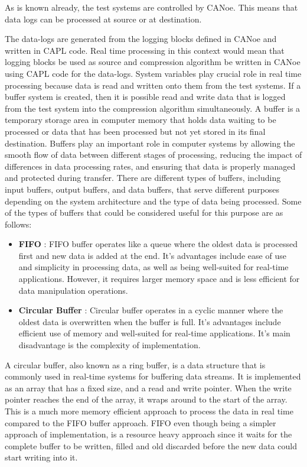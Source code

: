 As is known already, the test systems are controlled by CANoe. This means that data logs can be processed at source or at destination. 

The data-logs are generated from the logging blocks defined in CANoe and written in CAPL code. Real time processing in this context would mean that logging blocks be used as source and compression algorithm be written in CANoe using CAPL code for the data-logs. System variables play crucial role in real time processing because data is read and written onto them from the test systems. If a buffer system is created, then it is possible read and write data that is logged from the test system into the compression algorithm simultaneously. A buffer is a temporary storage area in computer memory that holds data waiting to be processed or data that has been processed but not yet stored in its final destination. Buffers play an important role in computer systems by allowing the smooth flow of data between different stages of processing, reducing the impact of differences in data processing rates, and ensuring that data is properly managed and protected during transfer. There are different types of buffers, including input buffers, output buffers, and data buffers, that serve different purposes depending on the system architecture and the type of data being processed. Some of the types of buffers that could be considered useful for this purpose are as follows:

\begin{itemize}
    \item \textbf{FIFO} : FIFO buffer operates like a queue where the oldest data is processed first and new data is added at the end. It's advantages include ease of use and simplicity in processing data, as well as being well-suited for real-time applications. However, it requires larger memory space and is less efficient for data manipulation operations.

    \item \textbf{Circular Buffer} : Circular buffer operates in a cyclic manner where the oldest data is overwritten when the buffer is full. It's advantages include efficient use of memory and well-suited for real-time applications. It's main disadvantage is the complexity of implementation.
\end{itemize}

A circular buffer, also known as a ring buffer, is a data structure that is commonly used in real-time systems for buffering data streams. It is implemented as an array that has a fixed size, and a read and write pointer. When the write pointer reaches the end of the array, it wraps around to the start of the array. This is a much more memory efficient approach to process the data in real time compared to the FIFO buffer approach. FIFO even though being a simpler approach of implementation, is a resource heavy approach since it waits for the complete buffer to be written, filled and old discarded before the new data could start writing into it. 

